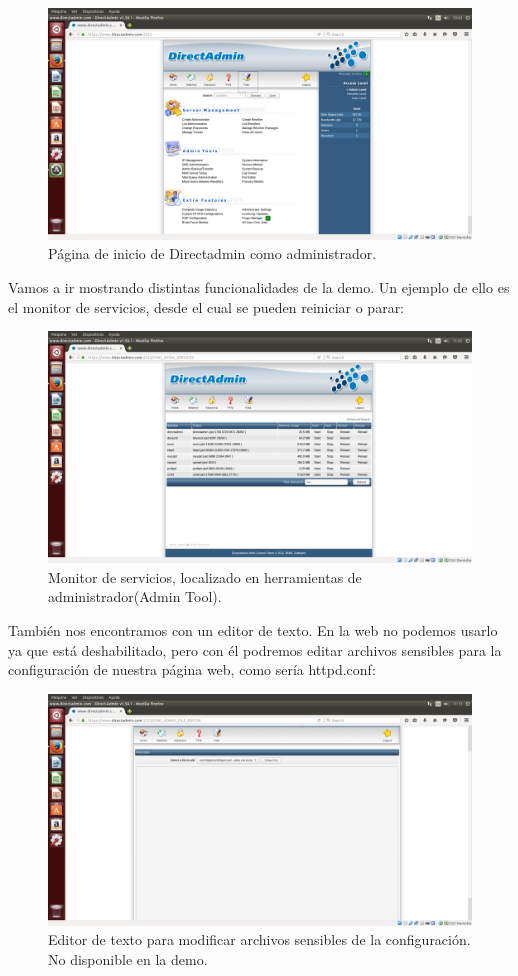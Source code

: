 \begin{itemize}
		\begin{figure}[H]
			\centering
			\includegraphics[width=0.7\linewidth]{DirectAdminStartPage}
			\caption[Pagina inicio direct admin]{Página de inicio de Directadmin como administrador.}
			\label{fig:DirectAdminStartPage}
		\end{figure}
		
		Vamos a ir mostrando distintas funcionalidades de la demo. Un ejemplo de ello es el monitor de servicios, desde el cual se pueden reiniciar o parar:\\
		
		\begin{figure}[H]
			\centering
			\includegraphics[width=0.7\linewidth]{DirectAdminServiceMonitor}
			\caption[Service monitor]{Monitor de servicios, localizado en herramientas de administrador(Admin Tool).}
			\label{fig:DirectAdminServiceMonitor}
		\end{figure}
		
		También nos encontramos con un editor de texto. En la web no podemos usarlo ya que está deshabilitado, pero con él podremos editar archivos sensibles para la configuración de nuestra página web, como sería httpd.conf:\\
		
		\begin{figure}[H]
			\centering
			\includegraphics[width=0.7\linewidth]{DirectAdminFileEditor}
			\caption[File Editor]{Editor de texto para modificar archivos sensibles de la configuración. No disponible en la demo.}
			\label{fig:DirectAdminFileEditor}
		\end{figure}
		

\end{itemize}
